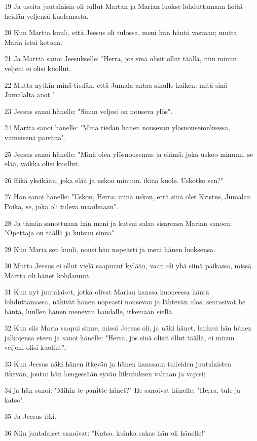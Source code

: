 \par 19 Ja useita juutalaisia oli tullut Martan ja Marian luokse lohduttamaan heitä heidän veljensä kuolemasta.
\par 20 Kun Martta kuuli, että Jeesus oli tulossa, meni hän häntä vastaan; mutta Maria istui kotona.
\par 21 Ja Martta sanoi Jeesukselle: "Herra, jos sinä olisit ollut täällä, niin minun veljeni ei olisi kuollut.
\par 22 Mutta nytkin minä tiedän, että Jumala antaa sinulle kaiken, mitä sinä Jumalalta anot."
\par 23 Jeesus sanoi hänelle: "Sinun veljesi on nouseva ylös".
\par 24 Martta sanoi hänelle: "Minä tiedän hänen nousevan ylösnousemuksessa, viimeisenä päivänä".
\par 25 Jeesus sanoi hänelle: "Minä olen ylösnousemus ja elämä; joka uskoo minuun, se elää, vaikka olisi kuollut.
\par 26 Eikä yksikään, joka elää ja uskoo minuun, ikinä kuole. Uskotko sen?"
\par 27 Hän sanoi hänelle: "Uskon, Herra; minä uskon, että sinä olet Kristus, Jumalan Poika, se, joka oli tuleva maailmaan".
\par 28 Ja tämän sanottuaan hän meni ja kutsui salaa sisarensa Marian sanoen: "Opettaja on täällä ja kutsuu sinua".
\par 29 Kun Maria sen kuuli, nousi hän nopeasti ja meni hänen luoksensa.
\par 30 Mutta Jeesus ei ollut vielä saapunut kylään, vaan oli yhä siinä paikassa, missä Martta oli hänet kohdannut.
\par 31 Kun nyt juutalaiset, jotka olivat Marian kanssa huoneessa häntä lohduttamassa, näkivät hänen nopeasti nousevan ja lähtevän ulos, seurasivat he häntä, luullen hänen menevän haudalle, itkemään siellä.
\par 32 Kun siis Maria saapui sinne, missä Jeesus oli, ja näki hänet, lankesi hän hänen jalkojensa eteen ja sanoi hänelle: "Herra, jos sinä olisit ollut täällä, ei minun veljeni olisi kuollut".
\par 33 Kun Jeesus näki hänen itkevän ja hänen kanssaan tulleiden juutalaisten itkevän, joutui hän hengessään syvän liikutuksen valtaan ja vapisi;
\par 34 ja hän sanoi: "Mihin te panitte hänet?" He sanoivat hänelle: "Herra, tule ja katso".
\par 35 Ja Jeesus itki.
\par 36 Niin juutalaiset sanoivat: "Katso, kuinka rakas hän oli hänelle!"
